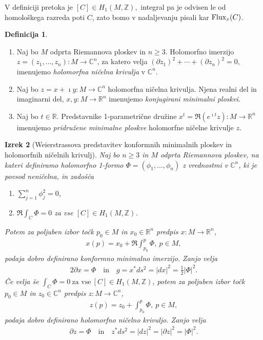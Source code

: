 \documentclass[12pt,a4paper,twoside]{article}
\theoremstyle{definition} %
\newtheorem{definicija}{Definicija}[section]
\theoremstyle{plain} %
\newtheorem{izrek}[definicija]{Izrek}
\numberwithin{equation}{section}  %
\newcommand{\R}{\mathbb R}
\newcommand{\Z}{\mathbb Z}
\newcommand{\C}{\mathbb C}
\begin{document}
V definiciji pretoka je $[C] \in H_{1} (M, \Z),$ integral pa je odvisen le od homološkega razreda poti $C$, zato bomo v nadaljevanju pisali kar $\textup{Flux}_{x} (C)$.

\begin{definicija}
\begin{enumerate}
\item
Naj bo $M$ odprta Riemannova ploskev in $n \geq 3$. Holomorfno imerzijo $z = (z_{1}, \dots , z_{n}) \colon M \to \C^{n}$, za katero velja
$(\partial{z_{1}})^2 + \cdots + (\partial{z_{n}})^2 = 0$, imenujemo \emph{holomorfna ničelna krivulja} v $\C^{n}$.
\item
Naj bo $z = x + \imath y \colon M \to \C^{n}$ holomorfna ničelna krivulja. Njena realni del in imaginarni del, $x, y \colon M \to \R^{n}$ imenujemo \emph{konjugirani minimalni ploskvi}.
\item
Naj bo $t \in \R$. Predstavnike 1-parametrične družine $x^{t} = \Re{(e^{\imath t} z)} \colon M \to \R^{n}$ imenujemo \emph{pridružene minimalne ploskve} holomorfne ničelne krivulje $z$.
\end{enumerate}
\end{definicija}

\begin{izrek}[Weierstrassova predstavitev konformnih minimalnih ploskev in holomorfnih ničelnih krivulj]
Naj bo $n \geq 3$ in $M$ odprta Riemannova ploskev, na kateri definiramo holomorfno 1-formo $\Phi = (\phi_{1}, \dots , \phi_{n})$ z vrednostmi v $\C^{n}$, ki je povsod neničelna, in zadošča 
\begin{enumerate}
\item $ \sum_{j=1}^{n} \phi_{j}^{2} = 0$,
\item $ \Re \int_{C} \Phi = 0 $ za vse $[C] \in H_{1} (M, \Z)$.
\end{enumerate}
Potem za poljuben izbor točk $p_0 \in M$ in $x_0 \in \R^{n}$ predpis $x \colon M \to \R^{n}$,
\begin{align} \label{eq:Wstrass-kmi}
x(p) = x_0 + \Re \int_{p_0}^{p} \Phi, \ p \in M,
\end{align}
podaja dobro definirano konformno minimalno imerzijo. Zanjo velja
\begin{align}
2 \partial{x} = \Phi \quad \text{in} \quad g = x^{*} ds^2 = |dx|^2 = \frac{1}{2} |\Phi|^2.
\end{align}
%
Če velja še
$ \int_{C} \Phi = 0 \ \text{za vse} \ [C] \in H_{1} (M, \Z) $,
potem za poljuben izbor točk $p_0 \in M$ in $z_0 \in \C^{n}$ predpis $z \colon M \to \C^{n}$,
\begin{align} \label{eq:Wstrass-hnk}
z(p) = z_0 + \int_{p_0}^{p} \Phi, \ p \in M,
\end{align}
podaja dobro definirano holomorfno ničelno krivuljo. Zanjo velja
\begin{align}
\partial{z} = \Phi \quad \text{in} \quad z^{*} ds^2 = |dz|^2 = |\partial{z}|^2 = |\Phi|^2.
\end{align}
\end{izrek}
\end{document}
